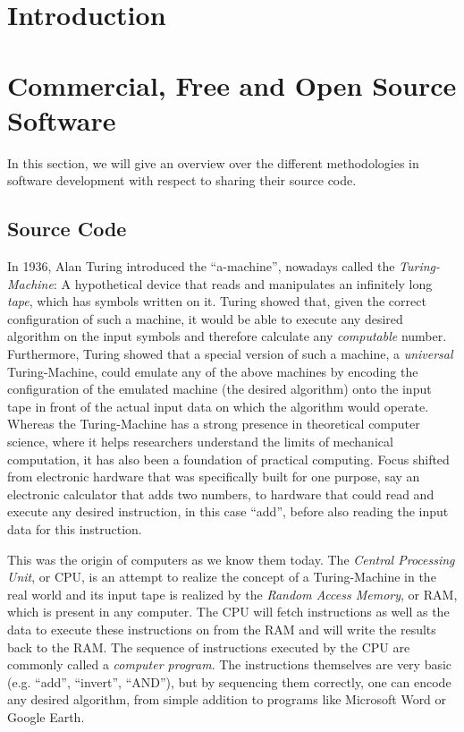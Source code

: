 \documentclass{article}
\begin{document}
\section{Introduction}

\section{Commercial, Free and Open Source Software}
In this section, we will give an overview over the different methodologies
in software development with respect to sharing their source code.
\subsection{Source Code}
In 1936, Alan Turing
introduced the ``a-machine'', nowadays
called the \emph{Turing-Machine}:
A hypothetical device that reads and manipulates an infinitely long
\emph{tape}, which has symbols written on it.
Turing showed that, given the correct configuration of such a machine,
it would be able to execute any desired algorithm on the input
symbols and therefore calculate any \emph{computable} number.
Furthermore, Turing showed that a special version of such a machine,
a \emph{universal} Turing-Machine, could emulate any of the above
machines by encoding the configuration of the emulated machine
(the desired algorithm) onto the input tape in front of the actual
input data on which the algorithm would operate. 
Whereas the Turing-Machine has a strong presence in theoretical
computer science, where it helps researchers understand the limits of
mechanical computation, it has also been a foundation of practical
computing. Focus shifted from electronic hardware that was
specifically built for one purpose, say an electronic calculator
that adds two numbers, to hardware that could read and execute any
desired instruction, in this case ``add'', before also reading the
input data for this instruction.

This was the origin of computers as we know them today.
The \emph{Central Processing Unit}, or CPU, is an attempt to realize the
concept of a Turing-Machine in the real world and its input tape is
realized by the \emph{Random Access Memory}, or RAM, which is present
in any computer. The CPU will fetch instructions as well as the data to
execute these instructions on from the RAM and will write the results
back to the RAM. The sequence of instructions executed by the CPU are
commonly called a \emph{computer program}. The instructions themselves
are very basic (e.g. ``add'', ``invert'', ``AND''), but by sequencing
them correctly, one can encode any desired algorithm, from simple
addition to programs like Microsoft Word or Google Earth.
\end{document}
